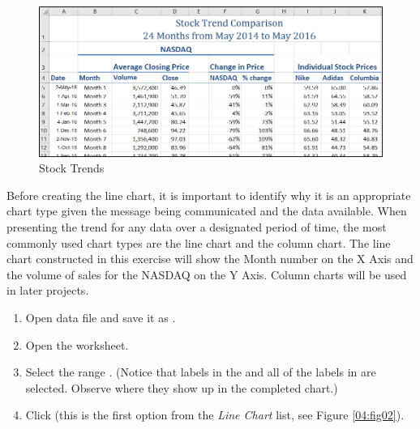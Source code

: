 \begin{figure}[H]
	\centering
	\includegraphics[width=\maxwidth{.95\linewidth}]{gfx/ch04_fig01}
	\caption{Stock Trends}
	\label{04:fig01}
\end{figure}

Before creating the line chart, it is important to identify why it is an appropriate chart type given the message being communicated and the data available. When presenting the trend for any data over a designated period of time, the most commonly used chart types are the line chart and the column chart. The line chart constructed in this exercise will show the Month number on the X Axis and the volume of sales for the NASDAQ on the Y Axis. Column charts will be used in later projects.

\begin{enumerate}
	\item Open data file  and save it as .
	\item Open the  worksheet.
	\item Select the range . (Notice that labels in the  and all of the labels in  are selected. Observe where they show up in the completed chart.)
	\item Click  (this is the first option from the \textit{Line Chart} list, see Figure \ref{04:fig02}).
\end{enumerate}

